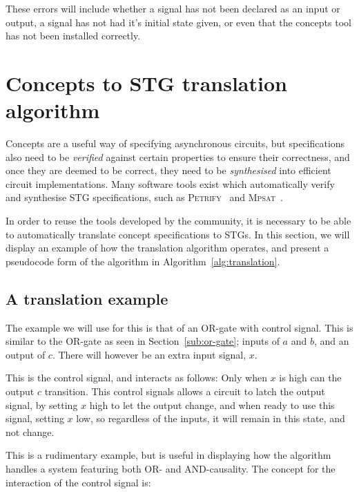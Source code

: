 \documentclass[british,conference,compsoc]{IEEEtran}
\newcommand{\noun}[1]{\textsc{#1}}
\begin{document}
These errors will include whether a signal has not been declared as an input or
output, a signal has not had it's initial state given, or even that the 
concepts tool has not been installed correctly. 

\section{Concepts to STG translation algorithm\label{sec:algorithm}}

Concepts are a useful way of specifying asynchronous circuits, but
specifications also need to be \emph{verified} against certain properties to
ensure their correctness, and once they are deemed to be correct, they need to
be \emph{synthesised} into efficient circuit implementations. Many software
tools exist which automatically verify and synthesise STG specifications,
such as \noun{Petrify}~\cite{Cortadella} and
\noun{Mpsat}~\cite{khomenko2004detecting}.

In order to reuse the tools developed by the community, it is
necessary to be able to automatically translate concept specifications to STGs.
In this section, we will display an example of how the translation algorithm 
operates, and present a pseudocode form of the algorithm in 
Algorithm~\ref{alg:translation}. 


\subsection{A translation example}

The example we will use for this is that of an OR-gate with control signal. 
This is similar to the OR-gate as seen in Section~\ref{sub:or-gate}; inputs
of $a$ and $b$, and an output of $c$. There will however be an extra 
input signal, $x$. 

This is the control signal, and interacts as follows:
Only when $x$ is high can the output $c$ transition. This control signals
allows a circuit to latch the output signal, by setting $x$ high to let
the output change, and when ready to use this signal, setting $x$ low,
so regardless of the inputs, it will remain in this state, and not change.

This is a rudimentary example, but is useful in displaying how the algorithm
handles a system featuring both OR- and AND-causality. The concept for 
the interaction of the control signal is:
\end{document}
